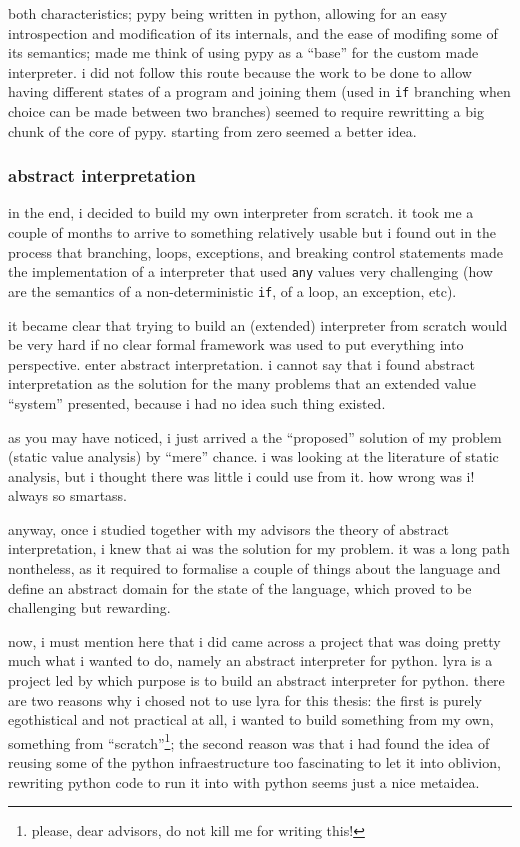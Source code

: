 both characteristics; pypy being written in python, allowing for an easy
introspection and modification of its internals, and the ease of
modifing some of its semantics; made me think of using pypy as a
\enquote{base} for the custom made interpreter. i did not follow this
route because the work to be done to allow having different states of a
program and joining them (used in \texttt{if} branching when choice can
be made between two branches) seemed to require rewritting a big chunk
of the core of pypy. starting from zero seemed a better idea.

\subsubsection*{abstract interpretation}

in the end, i decided to build my own interpreter from scratch. it took
me a couple of months to arrive to something relatively usable but i
found out in the process that branching, loops, exceptions, and breaking
control statements made the implementation of a interpreter that used
\texttt{any} values very challenging (how are the semantics of a
non-deterministic \texttt{if}, of a loop, an exception, etc).

it became clear that trying to build an (extended) interpreter from
scratch would be very hard if no clear formal framework was used to put
everything into perspective. enter abstract interpretation. i cannot say
that i found abstract interpretation as the solution for the many
problems that an extended value \enquote{system} presented, because i
had no idea such thing existed.

as you may have noticed, i just arrived a the \enquote{proposed}
solution of my problem (static value analysis) by \enquote{mere} chance.
i was looking at the literature of static analysis, but i thought there
was little i could use from it. how wrong was i! always so
smartass{}.

anyway, once i studied together with my advisors the theory of abstract
interpretation, i knew that ai was the solution for my problem. it was a
long path nontheless, as it required to formalise a couple of things
about the language and define an abstract domain for the state of the
language, which proved to be challenging but rewarding.

now, i must mention here that i did came across a project that was doing
pretty much what i wanted to do, namely an abstract interpreter for
python. {} lyra is a project led by {} which purpose is to build an abstract interpreter for python. there
are two reasons why i chosed not to use lyra for this thesis: the first
is purely egothistical and not practical at all, i wanted to build
something from my own, something from \enquote{scratch}\footnote{please,
  dear advisors, do not kill me for writing this!}; the second reason
was that i had found the idea of reusing some of the python
infraestructure too fascinating to let it into oblivion, rewriting
python code to run it into with python seems just a nice metaidea.

